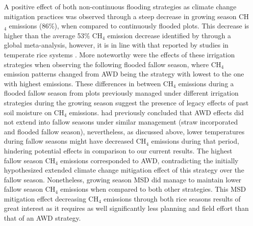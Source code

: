 A positive effect of both non-continuous flooding strategies as climate change mitigation practices was observed through a steep decrease in growing season CH$_{4}$ emissions (86\%), when compared to continuously flooded plots. This decrease is higher than the average 53\% CH$_{4}$ emission decrease identified by \cite{jiang2019water} through a global meta-analysis, however, it is in line with that reported by studies in temperate rice systems \citep{linquist2015, lahue2016}. More noteworthy were the effects of these irrigation strategies when observing the following flooded fallow season, where CH$_{4}$ emission patterns changed from AWD being the strategy with lowest to the one with highest emissions. These differences in between CH$_{4}$ emissions during a flooded fallow season from plots previously managed under different irrigation strategies during the growing season suggest the presence of legacy effects of past soil moisture on CH$_{4}$ emissions. \cite{lahue2016} had previously concluded that AWD effects did not extend into fallow seasons under similar management (straw incorporated and flooded fallow season), nevertheless, as discussed above, lower temperatures during fallow seasons might have decreased CH$_{4}$ emissions during that period, hindering potential effects in comparison to our current results. The highest fallow season CH$_{4}$ emissions corresponded to AWD, contradicting the initially hypothesized extended climate change mitigation effect of this strategy over the fallow season. Nonetheless, growing season MSD did manage to maintain lower fallow season CH$_{4}$ emissions when compared to both other strategies. This MSD mitigation effect decreasing CH$_{4}$ emissions through both rice seasons results of great interest as it requires as well significantly less planning and field effort than that of an AWD strategy.\\ 

